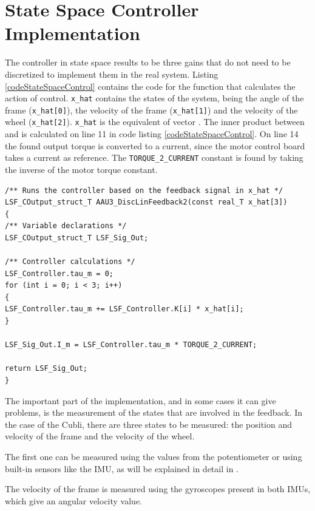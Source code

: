 \section{State Space Controller Implementation}\label{sec:SSImplementation}
The controller in state space results to be three gains that do not need to be discretized to implement them in the real system. Listing \ref{codeStateSpaceControl} contains the code for the function that calculates the action of control.
\texttt{x\_hat} contains the states of the system, being the angle of the frame (\texttt{x\_hat[0]}), the velocity of the frame (\texttt{x\_hat[1]}) and the velocity of the wheel (\texttt{x\_hat[2]}). \texttt{x\_hat} is the equivalent of vector \si{}. The inner product between \si{} and \si{} is calculated on line 11 in code listing \ref{codeStateSpaceControl}. On line 14 the found output torque is converted to a current, since the motor control board takes a current as reference. The \texttt{TORQUE\_2\_CURRENT} constant is found by taking the inverse of the motor torque constant.
\begin{lstlisting}[caption  = {Code for the implementation of the State Space Controller. The feedback from the Cubli is contained in the array x\_hat.},
label    = codeStateSpaceControl ]
/** Runs the controller based on the feedback signal in x_hat */
LSF_COutput_struct_T AAU3_DiscLinFeedback2(const real_T x_hat[3])
{
/** Variable declarations */
LSF_COutput_struct_T LSF_Sig_Out;

/** Controller calculations */
LSF_Controller.tau_m = 0;
for (int i = 0; i < 3; i++)
{
LSF_Controller.tau_m += LSF_Controller.K[i] * x_hat[i];
}

LSF_Sig_Out.I_m = LSF_Controller.tau_m * TORQUE_2_CURRENT;

return LSF_Sig_Out;
}
\end{lstlisting}
The important part of the implementation, and in some cases it can give problems, is the measurement of the states that are involved in the feedback.
In the case of the Cubli, there are three states to be measured: the position and velocity of the frame and the velocity of the wheel.

The first one can be measured using the values from the potentiometer or using built-in sensors like the IMU, as will be explained in detail in .

The velocity of the frame is measured using the gyroscopes present in both IMUs, which give an angular velocity value.

